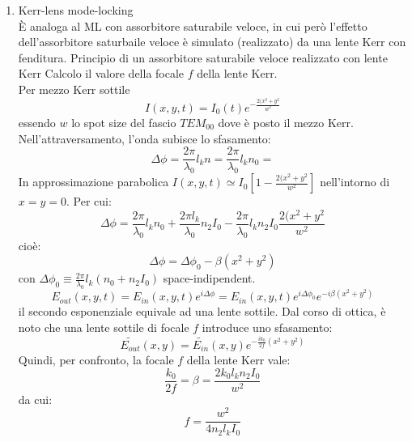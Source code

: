 \documentclass{book}
\def \D {\Delta}
\def \l {\lambda}
\theoremstyle{remark}
\begin{document}
\begin{enumerate}
\item Kerr-lens mode-locking\\
È analoga al ML con assorbitore saturabile veloce, in cui però l'effetto dell'assorbitore saturbaile veloce è simulato (realizzato) da una lente Kerr con fenditura. Principio di un assorbitore saturabile veloce realizzato con lente Kerr
Calcolo il valore della focale $f$ della lente Kerr.\\
Per mezzo Kerr sottile
\begin{equation*}
I(x,y,t) = I_0(t) e^{-\frac{2(x^2 + y^2}{w^2}}
\end{equation*}
essendo $w$ lo spot size del fascio $TEM_{00}$ dove è posto il mezzo Kerr. Nell'attraversamento, l'onda subisce lo sfasamento:
\begin{equation*}
\D\phi = \frac{2\pi}{\l_0} l_k n = \frac{2\pi}{\l_0} l_k n_0 =
\end{equation*}
In approssimazione parabolica
$I(x,y,t) \simeq I_0 \left[1 - \frac{2(x^2 + y^2}{w^2}\right]$ nell'intorno di $x=y=0$.
Per cui:
\begin{equation*}
\D\phi = \frac{2\pi}{\l_0} l_k n_0 + \frac{2\pi l_k}{\l_0}n_2I_0 - \frac{2\pi}{\l_0} l_kn_2I_0 \frac{2(x^2 + y^2}{w^2}
\end{equation*}
cioè:
\begin{equation*}
\D\phi = \D\phi_0 - \beta(x^2+y^2)
\end{equation*}
con $\D\phi_0 \equiv \frac{2\pi}{\l_0} l_k (n_0 + n_2I_0)$ space-indipendent.
\begin{equation*}
E_{out}(x,y,t) = E_{in}(x,y,t) e^{i\D\phi} = E_{in}(x,y,t)
e^{i\D\phi_0} e^{-i\beta(x^2+y^2)}
\end{equation*}
il secondo esponenziale equivale ad una lente sottile.
Dal corso di ottica, è noto che una lente sottile di focale $f$ introduce uno sfasamento:
\begin{equation*}
\tilde{E_{out}}(x,y) = \tilde{E_{in}}(x,y) e^{-\frac{ik_0}{2f}(x^2+y^2)}
\end{equation*}
Quindi, per confronto, la focale $f$ della lente Kerr vale:
\begin{equation*}
\frac{k_0}{2f} = \beta = \frac{2k_0 l_k n_2 I_0}{w^2}
\end{equation*}
da cui:
\begin{equation*}
f = \frac{w^2}{4 n_2 l_k I_0}
\end{equation*}

\end{enumerate}
\end{document}
